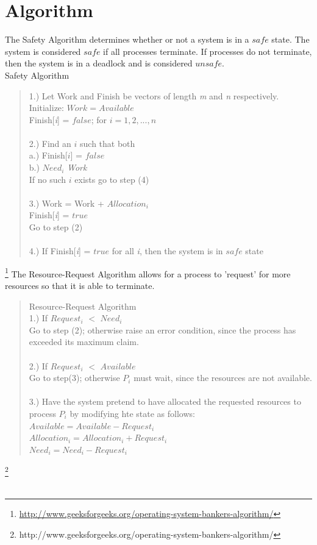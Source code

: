 \documentclass[letterpaper,oneside,10pt]{article}
\begin{document}
\section{Algorithm}
The Safety Algorithm determines whether or not a system is in a $safe$ state. The system is considered $safe$ if all processes terminate. If processes do not terminate, then the system is in a deadlock and is considered $unsafe$.
\\
Safety Algorithm \\
\begin{quote}
	1.) Let Work and Finish be vectors of length \textit{m} and \textit{n} respectively.
	Initialize: $Work = Available$ \\
  Finish[\textit{i}] = $false$; for $i = 1, 2, ..., n$ \\ \\
	2.) Find an $i$ such that both \\
	a.) Finish[$i$] = $false$ \\
	b.) $Need_i$ \leq \textit{Work} \\
	If no such $i$ exists go to step (4) \\ \\
	3.) Work = Work + $Allocation_i$ \\
	\indent Finish[\textit{i}] = $true$ \\
	\indent Go to step (2) \\ \\
	4.) If Finish[\textit{i}] = $true$ for all \textit{i}, then the system is in $safe$ state \\
\end{quote}
\footnote{\url{http://www.geeksforgeeks.org/operating-system-bankers-algorithm/}}
The Resource-Request Algorithm allows for a process to 'request' for more resources so that it is able to terminate.
\begin{quotation}
Resource-Request Algorithm \\
	1.) If $Request_i$ $<$ $Need_i$ \\
					Go to step (2); otherwise raise an error condition, since the process has exceeded its maximum claim. \\ \\
	2.) If $Request_i$ $<$ $Available$ \\
					Go to step(3); otherwise $P_i$ must wait, since the resources are not available. \\ \\
	3.) Have the system pretend to have allocated the requested resources to process $P_i$ by modifying hte state as follows: \\ 
					$Available = Available - Request_i$ \\
					$Allocation_i = Allocation_i + Request_i$ \\
					$Need_i = Need_i - Request_i$ \\
\end{quotation} \footnote{http://www.geeksforgeeks.org/operating-system-bankers-algorithm/}
\\
\\
\end{document}
